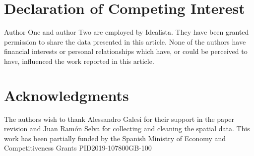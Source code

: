 \documentclass[Royal,times,sageh]{sagej}
\begin{document}
\hypertarget{declaration-of-competing-interest}{%
\section{Declaration of Competing
Interest}\label{declaration-of-competing-interest}}

Author One and author Two are employed by Idealista. They have been
granted permission to share the data presented in this article. None of
the authors have financial interests or personal relationships which
have, or could be perceived to have, influenced the work reported in
this article.

\hypertarget{acknowledgments}{%
\section{Acknowledgments}\label{acknowledgments}}

The authors wish to thank Alessandro Galesi for their support in the
paper revision and Juan Ramón Selva for collecting and cleaning the
spatial data. This work has been partially funded by the Spanish
Ministry of Economy and Competitiveness Grants PID2019-107800GB-100



\end{document}
